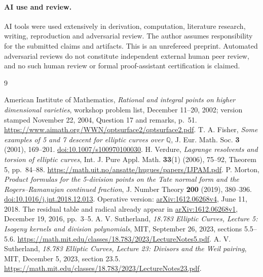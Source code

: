 \documentclass[11pt]{article}
\newcommand{\Q}{\mathbb Q}
\begin{document}
\paragraph{AI use and review.}
AI tools were used extensively in derivation, computation, literature
research, writing, reproduction and adversarial review. The author
assumes responsibility for the submitted claims and artifacts. This
is an unrefereed preprint. Automated adversarial reviews do not
constitute independent external human peer review, and no such human
review or formal proof-assistant certification is claimed.

\begin{thebibliography}{9}
\raggedright
{} American Institute of Mathematics,
\emph{Rational and integral points on higher dimensional varieties},
workshop problem list, December 11--20, 2002; version stamped
November 22, 2004, Question 17 and remarks, p.~51.
\url{https://www.aimath.org/WWN/qptsurface2/qptsurface2.pdf}.
 T. A. Fisher, \emph{Some examples of 5 and 7 descent for
elliptic curves over $\Q$}, J. Eur. Math. Soc. \textbf{3} (2001), 169--201.
\href{https://doi.org/10.1007/s100970100030}{doi:10.1007/s100970100030}.
 H. Verdure, \emph{Lagrange resolvents and torsion of
elliptic curves}, Int. J. Pure Appl. Math. \textbf{33}(1) (2006), 75--92,
Theorem 5, pp.~84--88.
\url{https://math.uit.no/ansatte/hugues/papers/IJPAM.pdf}.
 P. Morton, \emph{Product formulas for the 5-division
points on the Tate normal form and the Rogers--Ramanujan continued
fraction}, J. Number Theory \textbf{200} (2019), 380--396.
\href{https://doi.org/10.1016/j.jnt.2018.12.013}{doi:10.1016/j.jnt.2018.12.013}.
Operative version: \href{https://arxiv.org/abs/1612.06268v4}{arXiv:1612.06268v4},
June 11, 2018. The residual table and radical already appear in
\href{https://arxiv.org/abs/1612.06268v1}{arXiv:1612.06268v1},
December 19, 2016, pp.~3--5.
 A. V. Sutherland, \emph{18.783 Elliptic Curves,
Lecture 5: Isogeny kernels and division polynomials}, MIT, September 26, 2023,
sections 5.5--5.6.
\url{https://math.mit.edu/classes/18.783/2023/LectureNotes5.pdf}.
 A. V. Sutherland, \emph{18.783 Elliptic Curves,
Lecture 23: Divisors and the Weil pairing}, MIT, December 5, 2023, section 23.5.
\url{https://math.mit.edu/classes/18.783/2023/LectureNotes23.pdf}.
\end{thebibliography}
\end{document}
